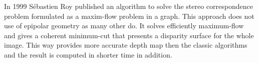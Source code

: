 In 1999 Sébastien Roy published an algorithm \cite{roy1998} \cite{roy1999} to solve the stereo correspondence problem formulated as a maxim-flow problem in a graph.
This approach does not use of epipolar geometry as many other do.
It solves efficiently maximum-flow and gives a coherent minimum-cut that presents a disparity surface for the whole image.
This way provides more accurate depth map then the classic algorithms and the result is computed in shorter time in addition.



